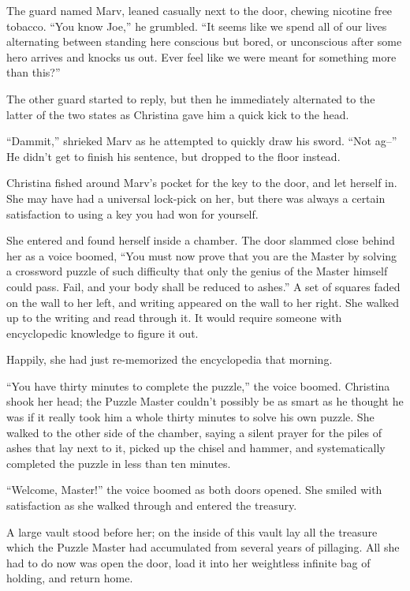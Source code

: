 \documentclass[showtrims,b6paper,draft,10pt]{memoir}
\begin{document}
The guard named Marv, leaned casually next to the door, chewing nicotine free tobacco.  “You know Joe,” he grumbled.  “It seems like we spend all of our lives alternating between standing here conscious but bored, or unconscious after some hero arrives and knocks us out.  Ever feel like we were meant for something more than this?”

The other guard started to reply, but then he immediately alternated to the latter of the two states as Christina gave him a quick kick to the head.

``Dammit,'' shrieked Marv as he attempted to quickly draw his sword.  ``Not ag--''  He didn’t get to finish his sentence, but dropped to the floor instead.

Christina fished around Marv’s pocket for the key to the door, and let herself in.  She may have had a universal lock-pick on her, but there was always a certain satisfaction to using a key you had won for yourself.

She entered and found herself inside a chamber.  The door slammed close behind her as a voice boomed, ``You must now prove that you are the Master by solving a crossword puzzle of such difficulty that only the genius of the Master himself could pass.  Fail, and your body shall be reduced to ashes.''  A set of squares faded on the wall to her left, and writing appeared on the wall to her right.  She walked up to the writing and read through it.  It would require someone with encyclopedic knowledge to figure it out.

Happily, she had just re-memorized the encyclopedia that morning.

``You have thirty minutes to complete the puzzle,'' the voice boomed.  Christina shook her head;  the Puzzle Master couldn’t possibly be as smart as he thought he was if it really took him a whole thirty minutes to solve his own puzzle.  She walked to the other side of the chamber, saying a silent prayer for the piles of ashes that lay next to it, picked up the chisel and hammer, and systematically completed the puzzle in less than ten minutes.

``Welcome, Master!''  the voice boomed as both doors opened.  She smiled with satisfaction as she walked through and entered the treasury.

A large vault stood before her;  on the inside of this vault lay all the treasure which the Puzzle Master had accumulated from several years of pillaging.  All she had to do now was open the door, load it into her weightless infinite bag of holding, and return home.
\end{document}
